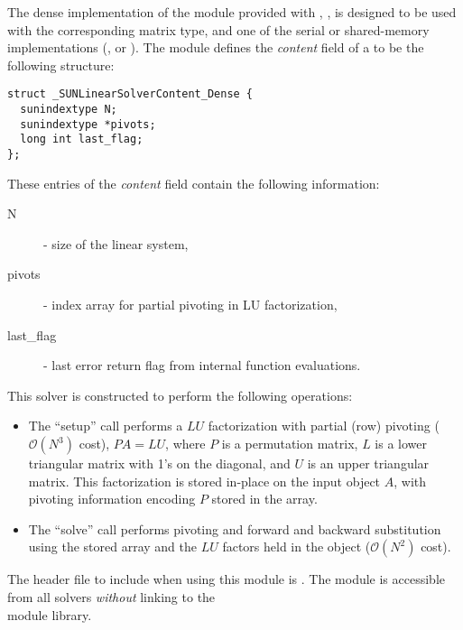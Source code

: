 
The dense implementation of the {\sunlinsol} module provided with
{\sundials}, {\sunlinsoldense}, is designed to be used with the
corresponding {\sunmatdense} matrix type, and one of the serial or
shared-memory {\nvector} implementations ({\nvecs}, {\nvecopenmp} or
{\nvecpthreads}).  The {\sunlinsoldense} module defines the {\em
content} field of a  to be the following structure:
\begin{verbatim} 
struct _SUNLinearSolverContent_Dense {
  sunindextype N;
  sunindextype *pivots;
  long int last_flag;
};
\end{verbatim}
These entries of the \emph{content} field contain the following
information:
\begin{description}
  \item[N] - size of the linear system,
  \item[pivots] - index array for partial pivoting in LU factorization,
  \item[last\_flag] - last error return flag from internal function evaluations.
\end{description}

This solver is constructed to perform the following operations:
\begin{itemize}
\item The ``setup'' call performs a $LU$ factorization with
  partial (row) pivoting ($\mathcal O(N^3)$ cost), $PA=LU$, where $P$
  is a permutation matrix, $L$ is a lower triangular matrix with 1's
  on the diagonal, and $U$ is an upper triangular matrix.  This
  factorization is stored in-place on the input {\sunmatdense} object
  $A$, with pivoting information encoding $P$ stored in
  the  array.
\item The ``solve'' call performs pivoting and forward and
  backward substitution using the stored  array and the
  $LU$ factors held in the {\sunmatdense} object ($\mathcal O(N^2)$
  cost).
\end{itemize}

\noindent The header file to include when using this module 
is . The {\sunlinsoldense} module
is accessible from all {\sundials} solvers \textit{without}
linking to the \\
 module library. \\

